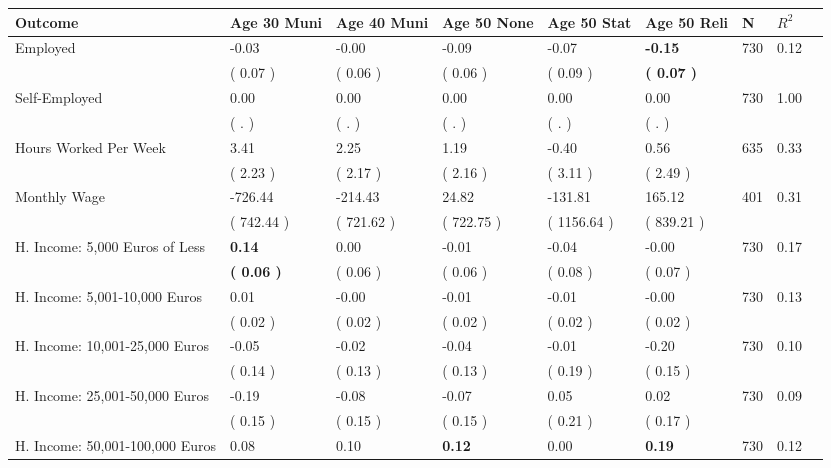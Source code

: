 \begin{tabular}{L{6.2cm} C{1.8cm} C{1.8cm} C{1.8cm} C{1.8cm} C{1.8cm} C{1.8cm} C{0.3cm} C{0.3cm}}
\toprule
 \textbf{Outcome} & \textbf{Age 30 Muni} & \textbf{Age 40 Muni} & \textbf{Age 50 None} & \textbf{Age 50 Stat} & \textbf{Age 50 Reli} & \textbf{N} & \textbf{$ R^2$} \\
\midrule
Employed &     -0.03 &     -0.00 &     -0.09 &     -0.07 & \textbf{    -0.15}  & 730 &       0.12 \\ 
 & (     0.07 ) & (     0.06 ) & (     0.06 ) & (     0.09 ) & \textbf{(     0.07 )}  & \\
Self-Employed &      0.00 &      0.00 &      0.00 &      0.00 &      0.00  & 730 &       1.00 \\ 
 & (        . ) & (        . ) & (        . ) & (        . ) & (        . )  & \\
Hours Worked Per Week &      3.41 &      2.25 &      1.19 &     -0.40 &      0.56  & 635 &       0.33 \\ 
 & (     2.23 ) & (     2.17 ) & (     2.16 ) & (     3.11 ) & (     2.49 )  & \\
Monthly Wage &   -726.44 &   -214.43 &     24.82 &   -131.81 &    165.12  & 401 &       0.31 \\ 
 & (   742.44 ) & (   721.62 ) & (   722.75 ) & (  1156.64 ) & (   839.21 )  & \\
H. Income: 5,000 Euros of Less & \textbf{     0.14} &      0.00 &     -0.01 &     -0.04 &     -0.00  & 730 &       0.17 \\ 
 & \textbf{(     0.06 )} & (     0.06 ) & (     0.06 ) & (     0.08 ) & (     0.07 )  & \\
H. Income: 5,001-10,000 Euros &      0.01 &     -0.00 &     -0.01 &     -0.01 &     -0.00  & 730 &       0.13 \\ 
 & (     0.02 ) & (     0.02 ) & (     0.02 ) & (     0.02 ) & (     0.02 )  & \\
H. Income: 10,001-25,000 Euros &     -0.05 &     -0.02 &     -0.04 &     -0.01 &     -0.20  & 730 &       0.10 \\ 
 & (     0.14 ) & (     0.13 ) & (     0.13 ) & (     0.19 ) & (     0.15 )  & \\
H. Income: 25,001-50,000 Euros &     -0.19 &     -0.08 &     -0.07 &      0.05 &      0.02  & 730 &       0.09 \\ 
 & (     0.15 ) & (     0.15 ) & (     0.15 ) & (     0.21 ) & (     0.17 )  & \\
H. Income: 50,001-100,000 Euros &      0.08 &      0.10 & \textbf{     0.12} &      0.00 & \textbf{     0.19}  & 730 &       0.12 \\ 

\end{tabular}
